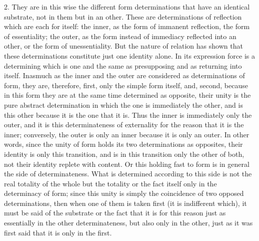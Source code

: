 2. They are in this wise the different form determinations
that have an identical substrate, not in them but in an other.
These are determinations of reflection
which are each for itself:
the inner, as the form of immanent reflection,
the form of essentiality;
the outer, as the form instead of
immediacy reflected into an other,
or the form of unessentiality.
But the nature of relation has shown that
these determinations constitute just one identity alone.
In its expression force is a determining
which is one and the same as presupposing
and as returning into itself.
Inasmuch as the inner and the outer are
considered as determinations of form,
they are, therefore,
first, only the simple form itself,
and, second, because in this form they are
at the same time determined as opposite,
their unity is the pure abstract determination
in which the one is immediately the other,
and is this other because it is the one that it is.
Thus the inner is immediately only the outer,
and it is this determinateness of externality
for the reason that it is the inner;
conversely, the outer is only an inner
because it is only an outer.
In other words, since the unity of form
holds its two determinations as opposites,
their identity is only this transition,
and is in this transition only the other of both,
not their identity replete with content.
Or this holding fast to form is in general
the side of determinateness.
What is determined according to this side is
not the real totality of the whole
but the totality or the fact itself
only in the determinacy of form;
since this unity is simply the coincidence
of two opposed determinations,
then when one of them is taken first
(it is indifferent which),
it must be said of the substrate or the fact
that it is for this reason just as essentially
in the other determinateness,
but also only in the other,
just as it was first said
that it is only in the first.

